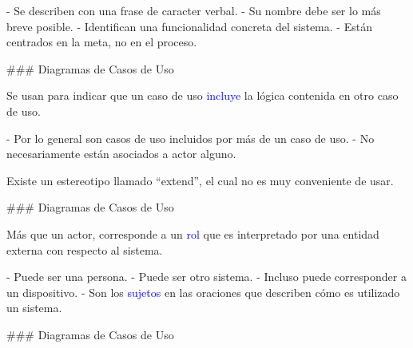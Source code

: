 \columnsend

- Se describen con una frase de caracter verbal.
- Su nombre debe ser lo más breve posible.
- Identifican una funcionalidad concreta del sistema.
- Están centrados en la meta, no en el proceso.


### Diagramas de Casos de Uso

\newline

\columnsbegin


\centering{}

 Se usan para indicar que un caso de uso \textcolor{blue}{incluye}
la lógica contenida en otro caso de uso.

- Por lo general son casos de uso incluidos por más de un caso de uso.
- No necesariamente están asociados a actor alguno.

Existe un estereotipo llamado ``extend'', el cual no es muy conveniente de usar.

\columnsend

### Diagramas de Casos de Uso

\newline

\columnsbegin


\vspace{-5mm}
\centering{}

 Más que un actor, corresponde a un \textcolor{blue}{rol} que es interpretado por una entidad
externa con respecto al sistema.\newline
\columnsend

- Puede ser una persona.
- Puede ser otro sistema.
- Incluso puede corresponder a un dispositivo.
- Son los \textcolor{blue}{sujetos} en las oraciones que describen cómo es utilizado un sistema.


### Diagramas de Casos de Uso

